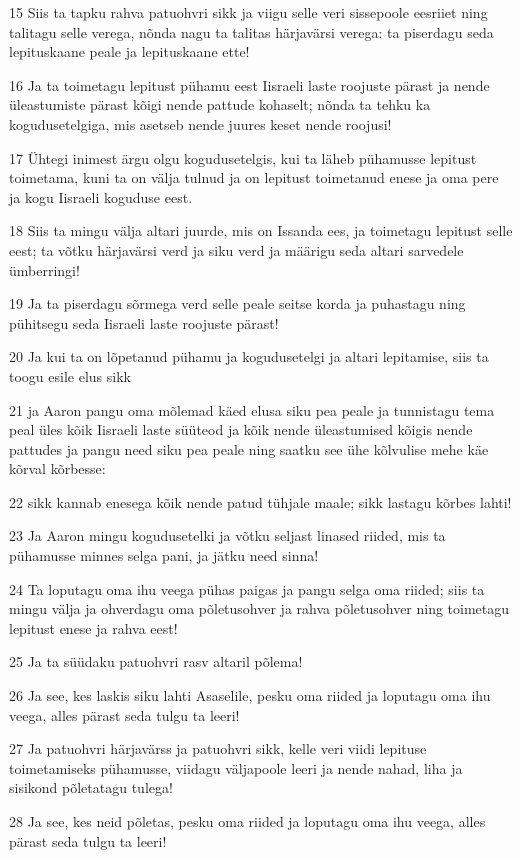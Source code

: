 \par 15 Siis ta tapku rahva patuohvri sikk ja viigu selle veri sissepoole eesriiet ning talitagu selle verega, nõnda nagu ta talitas härjavärsi verega: ta piserdagu seda lepituskaane peale ja lepituskaane ette!
\par 16 Ja ta toimetagu lepitust pühamu eest Iisraeli laste roojuste pärast ja nende üleastumiste pärast kõigi nende pattude kohaselt; nõnda ta tehku ka kogudusetelgiga, mis asetseb nende juures keset nende roojusi!
\par 17 Ühtegi inimest ärgu olgu kogudusetelgis, kui ta läheb pühamusse lepitust toimetama, kuni ta on välja tulnud ja on lepitust toimetanud enese ja oma pere ja kogu Iisraeli koguduse eest.
\par 18 Siis ta mingu välja altari juurde, mis on Issanda ees, ja toimetagu lepitust selle eest; ta võtku härjavärsi verd ja siku verd ja määrigu seda altari sarvedele ümberringi!
\par 19 Ja ta piserdagu sõrmega verd selle peale seitse korda ja puhastagu ning pühitsegu seda Iisraeli laste roojuste pärast!
\par 20 Ja kui ta on lõpetanud pühamu ja kogudusetelgi ja altari lepitamise, siis ta toogu esile elus sikk
\par 21 ja Aaron pangu oma mõlemad käed elusa siku pea peale ja tunnistagu tema peal üles kõik Iisraeli laste süüteod ja kõik nende üleastumised kõigis nende pattudes ja pangu need siku pea peale ning saatku see ühe kõlvulise mehe käe kõrval kõrbesse:
\par 22 sikk kannab enesega kõik nende patud tühjale maale; sikk lastagu kõrbes lahti!
\par 23 Ja Aaron mingu kogudusetelki ja võtku seljast linased riided, mis ta pühamusse minnes selga pani, ja jätku need sinna!
\par 24 Ta loputagu oma ihu veega pühas paigas ja pangu selga oma riided; siis ta mingu välja ja ohverdagu oma põletusohver ja rahva põletusohver ning toimetagu lepitust enese ja rahva eest!
\par 25 Ja ta süüdaku patuohvri rasv altaril põlema!
\par 26 Ja see, kes laskis siku lahti Asaselile, pesku oma riided ja loputagu oma ihu veega, alles pärast seda tulgu ta leeri!
\par 27 Ja patuohvri härjavärss ja patuohvri sikk, kelle veri viidi lepituse toimetamiseks pühamusse, viidagu väljapoole leeri ja nende nahad, liha ja sisikond põletatagu tulega!
\par 28 Ja see, kes neid põletas, pesku oma riided ja loputagu oma ihu veega, alles pärast seda tulgu ta leeri!
